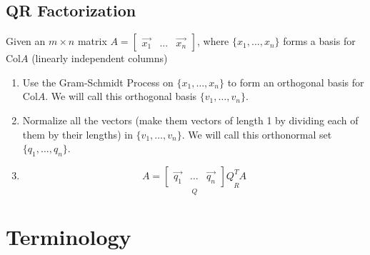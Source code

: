 \documentclass[a4paper,12pt]{article}
\theoremstyle{definition}
\theoremstyle{definition}
\newcommand{\finitevecs}[2]{#1_1,\ldots,#1_#2}
\newcommand{\finitevecsset}[2]{\{\finitevecs{#1}{#2}\}}
\begin{document}
	\subsection{QR Factorization}
	\label{sec:qr-factorization}
	Given an $m \times n$ matrix
	$A =
	\begin{bmatrix}
		\vec{x_1} & ... & \vec{x_n}
	\end{bmatrix}$, where $\finitevecsset{x}{n}$ forms a basis for Col$A$ (linearly independent columns)
	\begin{enumerate}
		\item Use the Gram-Schmidt Process on $\finitevecsset{x}{n}$ to form an orthogonal basis for Col$A$. We will call this orthogonal basis $\finitevecsset{v}{n}$.
		
		\item Normalize all the vectors (make them vectors of length 1 by dividing each of them by their lengths) in $\finitevecsset{v}{n}$. We will call this orthonormal set $\finitevecsset{q}{n}$.
		
		\item
		\begin{equation*}
			A = 
			\underset{Q}{
				\begin{bmatrix}
					\vec{q_1} & \ldots & \vec{q_n}
				\end{bmatrix}
			}
			\underset{R}{Q^TA}
		\end{equation*}
	\end{enumerate}
	\newpage
	
	\section{Terminology}
\end{document}
